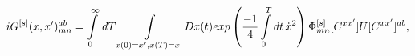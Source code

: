 \begin{equation}
iG^{[s]}(x,x')_{mn}^{ab}=\int\limits_0^\infty\,dT\int\limits_{x(0)=x',x(T)=x}Dx(t) 
exp\left({-1\over 4}
\int\limits_0^Tdt\,\dot{x}^2\right)\Phi^{[s]}_{mn}[C^{xx'}]U[C^{xx'}]^{ab},
\end{equation}

